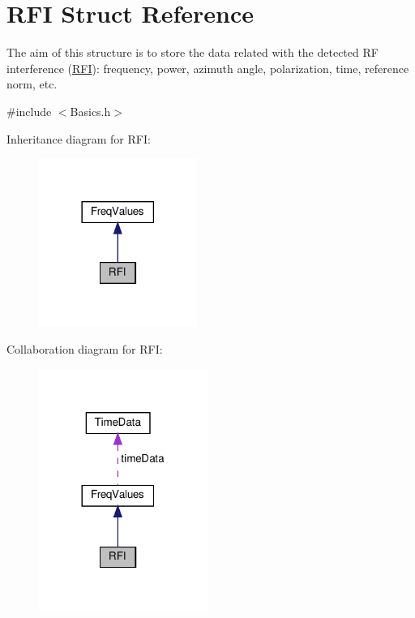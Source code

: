 \hypertarget{structRFI}{}\section{R\+FI Struct Reference}
\label{structRFI}


The aim of this structure is to store the data related with the detected RF interference (\hyperlink{structRFI}{R\+FI})\+: frequency, power, azimuth angle, polarization, time, reference norm, etc.  




{\ttfamily \#include $<$Basics.\+h$>$}



Inheritance diagram for R\+FI\+:
\nopagebreak
\begin{figure}[H]
\begin{center}
\leavevmode
\includegraphics[width=146pt]{structRFI__inherit__graph}
\end{center}
\end{figure}


Collaboration diagram for R\+FI\+:
\nopagebreak
\begin{figure}[H]
\begin{center}
\leavevmode
\includegraphics[width=156pt]{structRFI__coll__graph}
\end{center}
\end{figure}
